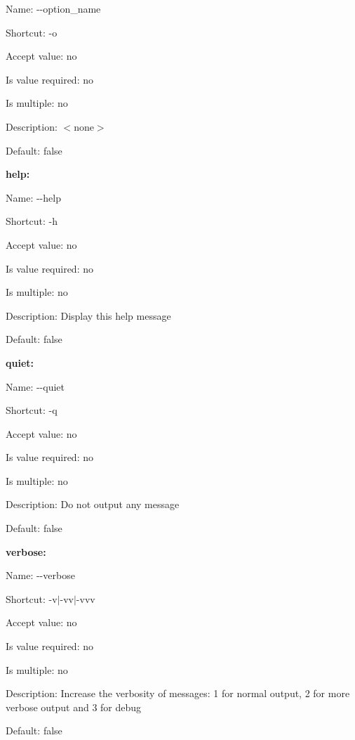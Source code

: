 \begin{DoxyItemize}
\item Name\+: {\ttfamily -\/-\/option\+\_\+name}
\item Shortcut\+: {\ttfamily -\/o}
\item Accept value\+: no
\item Is value required\+: no
\item Is multiple\+: no
\item Description\+: $<$none$>$
\item Default\+: {\ttfamily false}
\end{DoxyItemize}

{\bfseries help\+:}


\begin{DoxyItemize}
\item Name\+: {\ttfamily -\/-\/help}
\item Shortcut\+: {\ttfamily -\/h}
\item Accept value\+: no
\item Is value required\+: no
\item Is multiple\+: no
\item Description\+: Display this help message
\item Default\+: {\ttfamily false}
\end{DoxyItemize}

{\bfseries quiet\+:}


\begin{DoxyItemize}
\item Name\+: {\ttfamily -\/-\/quiet}
\item Shortcut\+: {\ttfamily -\/q}
\item Accept value\+: no
\item Is value required\+: no
\item Is multiple\+: no
\item Description\+: Do not output any message
\item Default\+: {\ttfamily false}
\end{DoxyItemize}

{\bfseries verbose\+:}


\begin{DoxyItemize}
\item Name\+: {\ttfamily -\/-\/verbose}
\item Shortcut\+: {\ttfamily -\/v$\vert$-\/vv$\vert$-\/vvv}
\item Accept value\+: no
\item Is value required\+: no
\item Is multiple\+: no
\item Description\+: Increase the verbosity of messages\+: 1 for normal output, 2 for more verbose output and 3 for debug
\item Default\+: {\ttfamily false}
\end{DoxyItemize}

